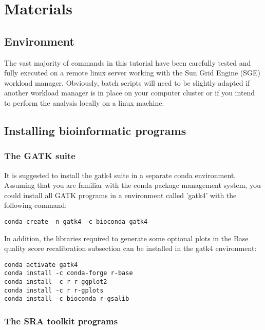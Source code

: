 \section{Materials}

\subsection{Environment}


The vast majority of commands in this tutorial have been carefully tested and fully executed on a remote linux server working with the Sun Grid Engine (SGE) workload manager. Obviously, batch scripts will need to be slightly adapted if another workload manager is in place on your computer cluster or if you intend to perform the analysis locally on a linux machine.





\subsection{Installing bioinformatic programs}

\subsubsection{The GATK suite}

It is suggested to install the gatk4 suite in a separate conda environment. Assuming that you are familiar with the conda package management system, you could install all GATK programs in a environment called 'gatk4' with the following command:

\begin{verbatim}
conda create -n gatk4 -c bioconda gatk4 
\end{verbatim}


In addition, the libraries required to generate some optional plots in the Base quality score recalibration subsection can be installed in the gatk4 environment:

\begin{verbatim}
conda activate gatk4
conda install -c conda-forge r-base
conda install -c r r-ggplot2
conda install -c r r-gplots
conda install -c bioconda r-gsalib
\end{verbatim}


\subsubsection{The SRA toolkit programs}

